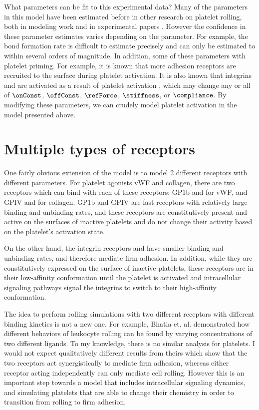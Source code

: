 What parameters can be fit to this experimental data? Many of the
parameters in this model have been estimated before in other research
on platelet rolling, both in modeling work
\cite{Fitzgibbon2014,Mody2008b,Wang2013} and in experimental papers
\cite{Litvinov2011,Litvinov2012}. However the confidence in these
parameter estimates varies depending on the parameter. For example,
the bond formation rate is difficult to estimate precisely and can
only be estimated to within several orders of magnitude. In addition,
some of these parameters with platelet priming. For example, it is
known that more adhesion receptors are recruited to the surface during
platelet activation. It is also known that integrins 
and  are activated as a result of platelet activation
\cite{Kee2015}, which may change any or all of $\onConst$,
$\offConst$, $\refForce$, $\stiffness$, or $\compliance$. By modifying
these parameters, we can crudely model platelet activation in the
model presented above.

\section{Multiple types of receptors}
\label{sec:multiple-receptors}

One fairly obvious extension of the model is to model 2 different
receptors with different parameters. For platelet agonists vWF and
collagen, there are two receptors which can bind with each of these
receptors: GP1b and  for vWF, and GPIV and
 for collagen. GP1b and GPIV are fast receptors with
relatively large binding and unbinding rates, and these receptors are
constitutively present and active on the surfaces of inactive
platelets and do not change their activity based on the platelet's
activation state.

On the other hand, the integrin receptors  and
 have smaller binding and unbinding rates, and therefore
mediate firm adhesion. In addition, while they are constitutively
expressed on the surface of inactive platelets, these receptors are
in their low-affinity conformation until the platelet is activated and
intracellular signaling pathways signal the integrins to switch to
their high-affinity conformation.

The idea to perform rolling simulations with two different receptors
with different binding kinetics is not a new one. For example, Bhatia
et. al. \cite{Bhatia2003} demonstrated how different behaviors of
leukocyte rolling can be found by varying concentrations of two
different ligands. To my knowledge, there is no similar analysis for
platelets. I would not expect qualitatively different results from
theirs which show that the two receptors act synergistically to
mediate firm adhesion, whereas either receptor acting independently
can only mediate cell rolling. However this is an important step
towards a model that includes intracellular signaling dynamics, and
simulating platelets that are able to change their chemistry in order
to transition from rolling to firm adhesion.

